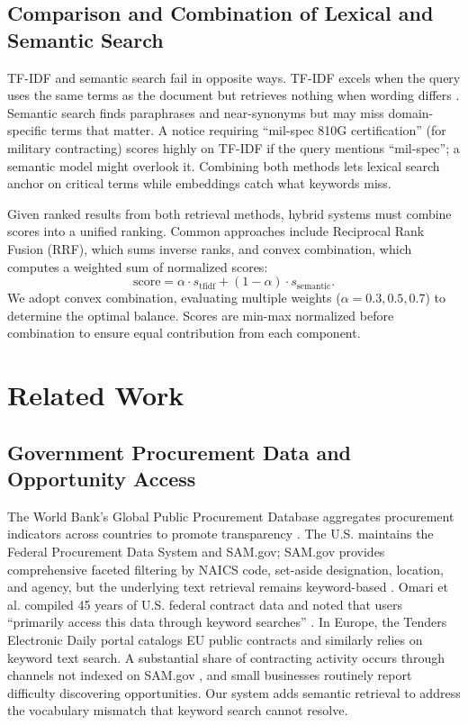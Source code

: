 \documentclass[10pt,twocolumn]{article}
\begin{document}
\subsection{Comparison and Combination of Lexical and Semantic Search}

TF-IDF and semantic search fail in opposite ways. TF-IDF excels when the query uses the same terms as the document but retrieves nothing when wording differs \cite{Rayo2025}. Semantic search finds paraphrases and near-synonyms but may miss domain-specific terms that matter. A notice requiring ``mil-spec 810G certification'' (for military contracting) scores highly on TF-IDF if the query mentions ``mil-spec''; a semantic model might overlook it. Combining both methods lets lexical search anchor on critical terms while embeddings catch what keywords miss.

Given ranked results from both retrieval methods, hybrid systems must combine scores into a unified ranking. Common approaches include Reciprocal Rank Fusion (RRF), which sums inverse ranks, and convex combination, which computes a weighted sum of normalized scores:
\begin{equation}
\text{score} = \alpha \cdot s_{\text{tfidf}} + (1 - \alpha) \cdot s_{\text{semantic}}.
\end{equation}
We adopt convex combination, evaluating multiple weights ($\alpha = 0.3, 0.5, 0.7$) to determine the optimal balance. Scores are min-max normalized before combination to ensure equal contribution from each component.

\section{Related Work}

\subsection{Government Procurement Data and Opportunity Access}

The World Bank's Global Public Procurement Database aggregates procurement indicators across countries to promote transparency \cite{WorldBank2023}. The U.S. maintains the Federal Procurement Data System and SAM.gov; SAM.gov provides comprehensive faceted filtering by NAICS code, set-aside designation, location, and agency, but the underlying text retrieval remains keyword-based \cite{Omari2025}. Omari et al. compiled 45 years of U.S. federal contract data and noted that users ``primarily access this data through keyword searches'' \cite{Omari2025}. In Europe, the Tenders Electronic Daily portal catalogs EU public contracts and similarly relies on keyword text search. A substantial share of contracting activity occurs through channels not indexed on SAM.gov \cite{HigherGov2022}, and small businesses routinely report difficulty discovering opportunities. Our system adds semantic retrieval to address the vocabulary mismatch that keyword search cannot resolve.
\end{document}
